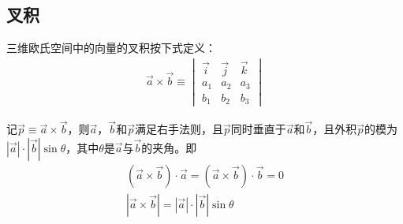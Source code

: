 \begin{definition}
  
\end{definition}


\subsection{叉积}
\label{sec:cross-product-of-vector}
\begin{definition}
  三维欧氏空间中的向量的叉积按下式定义：
  \begin{align*}
    \vec{a}\times\vec{b}\equiv
    \begin{vmatrix}
      \vec i & \vec j & \vec k\\
      a_1    & a_2    & a_3\\
      b_1    & b_2    & b_3
    \end{vmatrix}
  \end{align*}
\end{definition}

\begin{theorem}
  记$\vec p\equiv\vec a\times \vec b$，则$\vec a$，$\vec b$和$\vec p$满足右手法则，且$\vec p$同时垂直于$\vec a$和$\vec b$，且外积$\vec p$的模为$\left|\vec a\right|\cdot\left|\vec b\right|\sin\theta$，其中$\theta$是$\vec a$与$\vec b$的夹角。即
  \begin{gather*}
    (\vec a\times \vec b)\cdot \vec a = (\vec a\times \vec b)\cdot \vec b = 0\\
    \left| \vec a\times \vec b\right| = \left| \vec a\right| \cdot \left| \vec b\right| \sin\theta
  \end{gather*}
\end{theorem}




